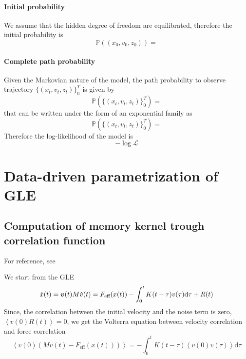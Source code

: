 \documentclass{article}
\numberwithin{equation}{section} %
\newcommand{\avg}[1]{\ensuremath{\left\langle #1 \right\rangle}}
\newcommand{\prob}[1]{\ensuremath{\mathbb{P}\left(#1\right)}}
\newcommand{\1}{\mathds{1}} %
\newcommand{\dd}{\mathrm{d}} %
\begin{document}
\paragraph{Initial probability}
We assume that the hidden degree of freedom are equilibrated, therefore the initial probability is
\begin{equation}
    \label{eq:initProbhidden}
    \prob{(x_0,v_0,z_0)} = 
\end{equation}

\paragraph{Complete path probability} Given the Markovian nature of the model, the path probability to observe trajectory $\{(x_t,v_t,z_t) \}_0^T $ is given by
\begin{equation}
    \label{eq:pathProbhidden}
    \prob{\{(x_t,v_t,z_t) \}_0^T } = 
\end{equation}
that can be written under the form of an exponential family as
\begin{equation}
    \label{eq:pathProbhidden_exp_fam}
    \prob{\{(x_t,v_t,z_t) \}_0^T } = 
\end{equation}
Therefore the log-likelihood of the model is
\begin{equation}
    \label{eq:log_likelihood_hidden_model}
    -\log \mathcal{L}
\end{equation}


\section{Data-driven parametrization of GLE}

\subsection{Computation of memory kernel trough correlation function}
For reference, see \cite{Kowalik2019}

We start from the GLE
\begin{equation}
    \label{eq:GLE_mem}
        \dot{x}(t)= \bm{v}(t) \\
    M\dot{v}(t) = F_\text{eff}(x(t)) - \int_0^t K(t-\tau) v(\tau) \dd \tau +R(t)
\end{equation}
Since, the correlation between the initial velocity and the noise term is zero, $\avg{v(0) R(t)} = 0$, we get the Volterra equation between velocity correlation and force correlation
\begin{equation}
    \label{eq:volterra}
    \avg{v(0) (M \dot v(t) - F_\text{eff}(x(t)))} = - \int_0^t K(t-\tau) \avg{v(0)v(\tau)} \dd \tau
\end{equation}
\end{document}
